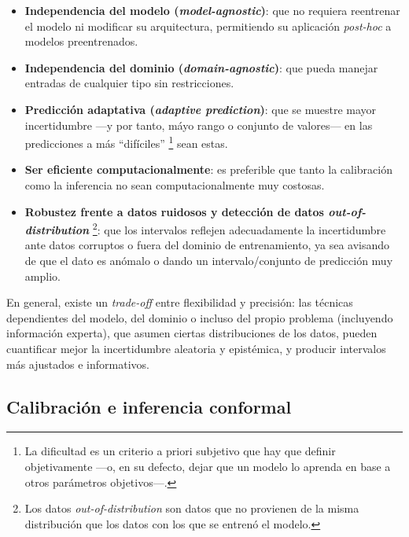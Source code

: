 \begin{itemize}
    \item \textbf{Independencia del modelo (\textit{model-agnostic})}: que no requiera reentrenar el modelo ni 
    modificar su arquitectura, permitiendo su aplicación \textit{post-hoc} a modelos preentrenados.

    \item \textbf{Independencia del dominio (\textit{domain-agnostic})}: que pueda manejar entradas de 
    cualquier tipo sin restricciones. 
     
    \item \textbf{Predicción adaptativa (\textit{adaptive prediction})}: que se muestre mayor incertidumbre 
    ---y por tanto, máyo rango o conjunto de valores--- en las predicciones a más ``difíciles''
    \footnote{
        La dificultad es un criterio a priori subjetivo que hay que definir objetivamente ---o, en su defecto,
        dejar que un modelo lo aprenda en base a otros parámetros objetivos---.
    } sean estas. 

    \item \textbf{Ser eficiente computacionalmente}: es preferible que tanto la calibración como la inferencia 
    no sean computacionalmente muy costosas. 
    
    \item \textbf{Robustez frente a datos ruidosos y detección de datos \textit{out-of-distribution}}
    \footnote{
        Los datos \textit{out-of-distribution} son datos que no provienen de la misma distribución que los 
        datos con los que se entrenó el modelo.
    }:
    que los intervalos reflejen adecuadamente la incertidumbre ante datos corruptos o fuera del dominio de 
    entrenamiento, ya sea avisando de que el dato es anómalo o dando un intervalo/conjunto de predicción
    muy amplio. 

\end{itemize}

En general, existe un \textit{trade-off} entre flexibilidad y precisión: las técnicas dependientes del modelo,
del dominio o incluso del propio problema (incluyendo información experta), que asumen ciertas distribuciones 
de los datos, pueden cuantificar mejor la incertidumbre aleatoria y epistémica, y producir intervalos más 
ajustados e informativos. 



\subsection{Calibración e inferencia conformal}

